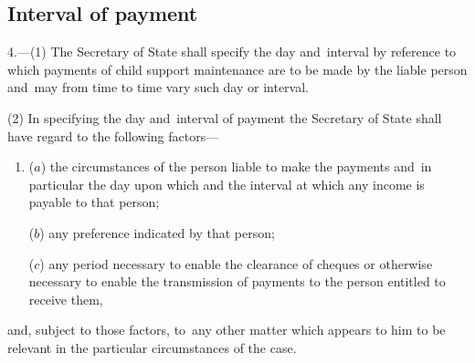 \documentclass[12pt,a4paper]{article}
\begin{document}

\subsection[4. Interval of payment]{Interval of payment}

4.—(1) The Secretary of State shall specify the day and~interval by reference to which payments of child support maintenance are to be made by the liable person and~may from time to time vary such day or interval.

%
%

(2) In specifying the day and~interval of payment the Secretary of State shall have regard to the following factors—
\begin{enumerate}\item[]
($a$) the circumstances of the person liable to make the payments and~in particular the day upon which and the interval at which any income is payable to that person;

($b$) any preference indicated by that person;

($c$) any period necessary to enable the clearance of cheques or otherwise necessary to enable the transmission of payments to the person entitled to receive them,
\end{enumerate}
and, subject to those factors, to~any other matter which appears to him to be relevant in the particular circumstances of the case.
\end{document}
